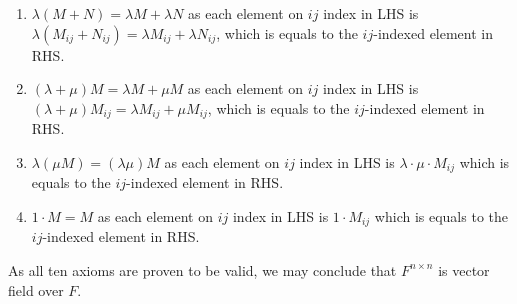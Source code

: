 \documentclass[11pt]{article}
\begin{document}
\begin{enumerate}
    \item $\lambda (M + N) = \lambda M + \lambda N$ as each element on $ij$ index in LHS is $\lambda(M_{ij} + N_{ij}) = \lambda M_{ij} + \lambda N_{ij}$, which is equals to the $ij$-indexed element in RHS.
    \item $(\lambda + \mu) M = \lambda M + \mu M$ as each element on $ij$ index in LHS is $(\lambda + \mu) M_{ij} =\lambda M_{ij} + \mu M_{ij}$, which is equals to the $ij$-indexed element in RHS.
    \item $\lambda (\mu M) = (\lambda \mu) M$ as each element on $ij$ index in LHS is $\lambda \cdot \mu \cdot  M_{ij}$ which is equals to the $ij$-indexed element in RHS.
    \item $1 \cdot M = M$  as each element on $ij$ index in LHS is $1 \cdot M_{ij}$ which is equals to the $ij$-indexed element in RHS.
\end{enumerate}\newline

As all ten axioms are proven to be valid, we may conclude that $F^{n \times n}$ is vector field over $F$.
\end{document}
